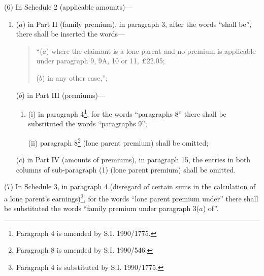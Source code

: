 \documentclass[a4paper]{article}
\begin{document}
(6) In Schedule 2 (applicable amounts)---

\begin{enumerate}\item[]
($a$) in Part II (family premium), in paragraph 3, after the words “shall be”, there shall be inserted the words—
\begin{quotation}
“($a$) where the claimant is a lone parent and no premium is applicable under paragraph 9, 9A, 10 or 11, £22.05;

($b$) in any other case,”;
\end{quotation}

($b$) in Part III (premiums)—
\begin{enumerate}\item[]
(i) in paragraph 4\footnote{\frenchspacing Paragraph 4 is amended by S.I. 1990/1775.}, for the words “paragraphs 8” there shall be substituted the words “paragraphs 9”;

(ii) paragraph 8\footnote{\frenchspacing Paragraph 8 is amended by S.I. 1990/546.} (lone parent premium) shall be omitted;
\end{enumerate}

($c$) in Part IV (amounts of premiums), in paragraph 15, the entries in both columns of sub-paragraph (1) (lone parent premium) shall be omitted.
\end{enumerate}

(7) In Schedule 3, in paragraph 4  (disregard of certain sums in the calculation of a lone parent’s earnings)\footnote{\frenchspacing Paragraph 4 is substituted by S.I. 1990/1775.}, for the words “lone parent premium under” there shall be substituted the words “family premium under paragraph 3($a$) of”.
\end{document}
